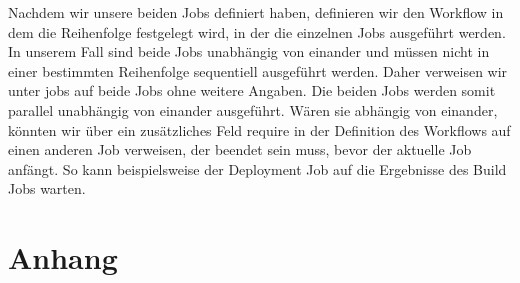 \documentclass[11pt]{article}
\begin{document}
Nachdem wir unsere beiden Jobs definiert haben, definieren wir den Workflow in dem die Reihenfolge festgelegt wird, in der die einzelnen Jobs ausgeführt werden. In unserem Fall sind beide Jobs unabhängig von einander und müssen nicht in einer bestimmten Reihenfolge sequentiell ausgeführt werden. Daher verweisen wir unter jobs auf beide Jobs ohne weitere Angaben. Die beiden Jobs werden somit parallel unabhängig von einander ausgeführt. Wären sie abhängig von einander, könnten wir über ein zusätzliches Feld require in der Definition des Workflows auf einen anderen Job verweisen, der beendet sein muss, bevor der aktuelle Job anfängt. So kann beispielsweise der Deployment Job auf die Ergebnisse des Build Jobs warten.

\section{Anhang}








\end{document}
